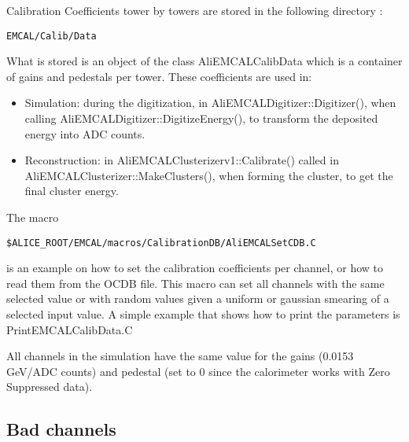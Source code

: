 Calibration Coefficients tower by towers are stored in the following directory :
\begin{lstlisting}
EMCAL/Calib/Data
\end{lstlisting}
What is stored is an object of the class AliEMCALCalibData which is a container of gains and pedestals per tower. These coefficients are used in:
\begin{itemize}
\item  Simulation:  during the digitization, in AliEMCALDigitizer::Digitizer(), when calling AliEMCALDigitizer::DigitizeEnergy(), to transform the deposited energy into ADC counts. 
\item  Reconstruction: in AliEMCALClusterizerv1::Calibrate() called in AliEMCALClusterizer::MakeClusters(), when forming the cluster, to get the final cluster energy.
\end{itemize}
The macro 
\begin{lstlisting}
$ALICE_ROOT/EMCAL/macros/CalibrationDB/AliEMCALSetCDB.C
\end{lstlisting}
is an example on how to set the calibration coefficients per channel, or how to read them from the OCDB file. This macro can set all channels with the same selected value or with random values given a uniform or gaussian smearing of a selected input value. A simple example that shows how to print the parameters is PrintEMCALCalibData.C

All channels in the simulation have the same value for the gains (0.0153 GeV/ADC counts) and pedestal (set to 0 since the calorimeter works with Zero Suppressed data).

\subsection{Bad channels}


